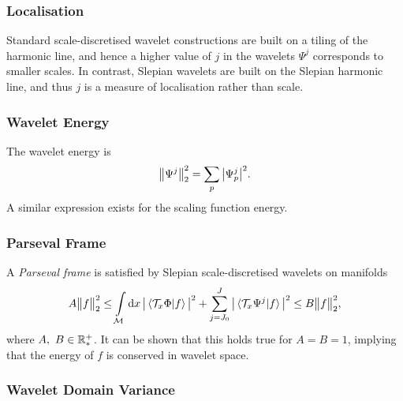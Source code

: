 \subsubsection{Localisation}\label{sec:chapter5_localisation}

Standard scale-discretised wavelet constructions are built on a tiling of the harmonic line, and hence a higher value of \(j\) in the wavelets \(\Psi^{j}\) corresponds to smaller scales.
In contrast, Slepian wavelets are built on the Slepian harmonic line, and thus \(j\) is a measure of localisation rather than scale.

\subsubsection{Wavelet Energy}

The wavelet energy is
%
\begin{equation}
	{\big\lVert\Psi^{j}\big\rVert}_{2}^{2}
	= \sum\limits_{p} \big\lvert{\Psi}_{p}^{j}\big\rvert^{2}.
\end{equation}
%
A similar expression exists for the scaling function energy.

\subsubsection{Parseval Frame}

A \emph{Parseval frame} is satisfied by Slepian scale-discretised wavelets on manifolds
%
\begin{equation}
	A{\big\lVert f\big\rVert}_{2}^{2} \leq \int\limits_{\mathcal{M}} \dd{x}
	\big\lvert\braket*{\mathcal{T}_{x}\Phi}{f}\big\rvert^{2}
	+ \sum\limits_{j=J_{0}}^{J} \big\lvert\braket*{\mathcal{T}_{x}\Psi^{j}}{f}\big\rvert^{2}
	\leq B{\big\lVert f\big\rVert}_{2}^{2},
\end{equation}
%
where \(A,\ B \in \mathbb{R}_{\ast}^{+}{}\).
It can be shown that this holds true for \(A = B = 1\), implying that the energy of \(f\) is conserved in wavelet space.

\subsubsection{Wavelet Domain Variance}

